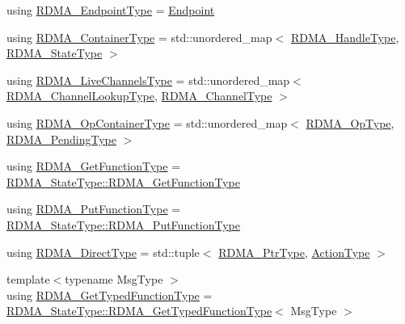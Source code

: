 \begin{DoxyCompactItemize}
\item 
using \hyperlink{structvt_1_1rdma_1_1_r_d_m_a_manager_a106350721a187d2cfb94a9017ef66a07}{R\+D\+M\+A\+\_\+\+Endpoint\+Type} = \hyperlink{structvt_1_1rdma_1_1_endpoint}{Endpoint}
\item 
using \hyperlink{structvt_1_1rdma_1_1_r_d_m_a_manager_a55dd81ff646ebb9d61ebf3a7239ec3b8}{R\+D\+M\+A\+\_\+\+Container\+Type} = std\+::unordered\+\_\+map$<$ \hyperlink{namespacevt_a10442579ec4e7ebef223818e64bcf908}{R\+D\+M\+A\+\_\+\+Handle\+Type}, \hyperlink{structvt_1_1rdma_1_1_r_d_m_a_manager_aad42879902ea82c4de357ad482d9333d}{R\+D\+M\+A\+\_\+\+State\+Type} $>$
\item 
using \hyperlink{structvt_1_1rdma_1_1_r_d_m_a_manager_a689c48ff97319fd83c19e7230b8e9d62}{R\+D\+M\+A\+\_\+\+Live\+Channels\+Type} = std\+::unordered\+\_\+map$<$ \hyperlink{structvt_1_1rdma_1_1_r_d_m_a_manager_a3df5b264f344d9d4530a96264782a725}{R\+D\+M\+A\+\_\+\+Channel\+Lookup\+Type}, \hyperlink{structvt_1_1rdma_1_1_r_d_m_a_manager_ad6a7e417dca07fe5743318e1153677a8}{R\+D\+M\+A\+\_\+\+Channel\+Type} $>$
\item 
using \hyperlink{structvt_1_1rdma_1_1_r_d_m_a_manager_a8c9def755fab6d3eb1f529175243f38a}{R\+D\+M\+A\+\_\+\+Op\+Container\+Type} = std\+::unordered\+\_\+map$<$ \hyperlink{namespacevt_1_1rdma_a9b966d9780a2b41afe7cd7b7b4b20300}{R\+D\+M\+A\+\_\+\+Op\+Type}, \hyperlink{structvt_1_1rdma_1_1_r_d_m_a_manager_a1239149a2070897c56e94e65c2016a7a}{R\+D\+M\+A\+\_\+\+Pending\+Type} $>$
\item 
using \hyperlink{structvt_1_1rdma_1_1_r_d_m_a_manager_a77d00c37a45276b36ef64b9226a8ef0f}{R\+D\+M\+A\+\_\+\+Get\+Function\+Type} = \hyperlink{structvt_1_1rdma_1_1_state_af0baaa6ac5c3b7b256d032f2ee845676}{R\+D\+M\+A\+\_\+\+State\+Type\+::\+R\+D\+M\+A\+\_\+\+Get\+Function\+Type}
\item 
using \hyperlink{structvt_1_1rdma_1_1_r_d_m_a_manager_a714321626dc5613772ac43564c6b7d85}{R\+D\+M\+A\+\_\+\+Put\+Function\+Type} = \hyperlink{structvt_1_1rdma_1_1_state_aa43a5d043fe01086818e9c5c364341d4}{R\+D\+M\+A\+\_\+\+State\+Type\+::\+R\+D\+M\+A\+\_\+\+Put\+Function\+Type}
\item 
using \hyperlink{structvt_1_1rdma_1_1_r_d_m_a_manager_a8bce76d1b441ca17daf84835eb9a7dec}{R\+D\+M\+A\+\_\+\+Direct\+Type} = std\+::tuple$<$ \hyperlink{namespacevt_aab05b4a584f7ee835a6d0f66915cf59b}{R\+D\+M\+A\+\_\+\+Ptr\+Type}, \hyperlink{namespacevt_ae0a5a7b18cc99d7b732cb4d44f46b0f3}{Action\+Type} $>$
\item 
{\footnotesize template$<$typename Msg\+Type $>$ }\\using \hyperlink{structvt_1_1rdma_1_1_r_d_m_a_manager_a0d865535d118fe9dcab074fd3df74ce1}{R\+D\+M\+A\+\_\+\+Get\+Typed\+Function\+Type} = \hyperlink{structvt_1_1rdma_1_1_state_a95b006a568982435e63aa18feb5fc202}{R\+D\+M\+A\+\_\+\+State\+Type\+::\+R\+D\+M\+A\+\_\+\+Get\+Typed\+Function\+Type}$<$ Msg\+Type $>$

\end{DoxyCompactItemize}
